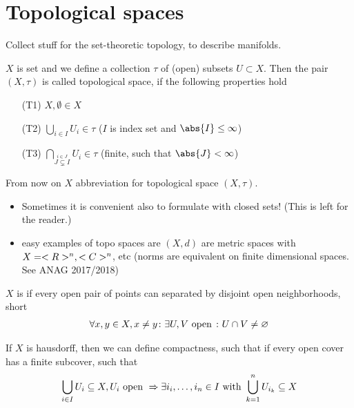 \section{Topological spaces}
Collect stuff for the set-theoretic topology, to describe manifolds.
\begin{definition}[Topology]
	$X$ is set and we define a collection $\tau$ of (open) subsets $U \subset X$. Then the pair $(X,\tau)$ is called topological space, if the following properties hold
	\begin{itemize}
		\item[(T1)] $X,\emptyset \in X$
		\item[(T2)] $\bigcup_{i \in I} U_i \in \tau$ ($I$ is index set and $\abs{I} \le \infty$)
		\item[(T3)] $\bigcap_{\stackrel{i \in J}{J\subsetneq I}}U_i \in \tau$ (finite, such that $\abs{J} < \infty$)
	\end{itemize}
\end{definition}
From now on $X$ abbreviation for topological space $(X,\tau)$.
\begin{*remark}
	\begin{itemize}
		\item Sometimes it is convenient  also to formulate with closed sets! (This is left for the reader.)
		\item easy examples of topo spaces are $(X,d)$ are metric spaces with $X = <R>^n, <C>^n$, etc (norms are equivalent on finite dimensional spaces. See ANAG 2017/2018)
	\end{itemize}
\end{*remark}
\begin{definition}
	\begin{defenum}
		\item $X$ is  if every open pair of points can separated by disjoint open neighborhoods, short
		\begin{align*}
		\forall x,y \in X, x\neq y \colon \exists U,V \text{ open }\colon U \cap V \neq \varnothing
		\end{align*}
		\item If $X$ is hausdorff, then we can define compactness, such that if every open cover has a finite subcover, such that
		\begin{align*}
			\bigcup_{i \in I} U_i \subseteq X, U_i \text{ open } \Rightarrow \exists i_i,\dots, i_n \in I \text{ with } \bigcup_{k=1}^n U_{i_k} \subseteq X
		\end{align*} 
	\end{defenum}
\end{definition}

